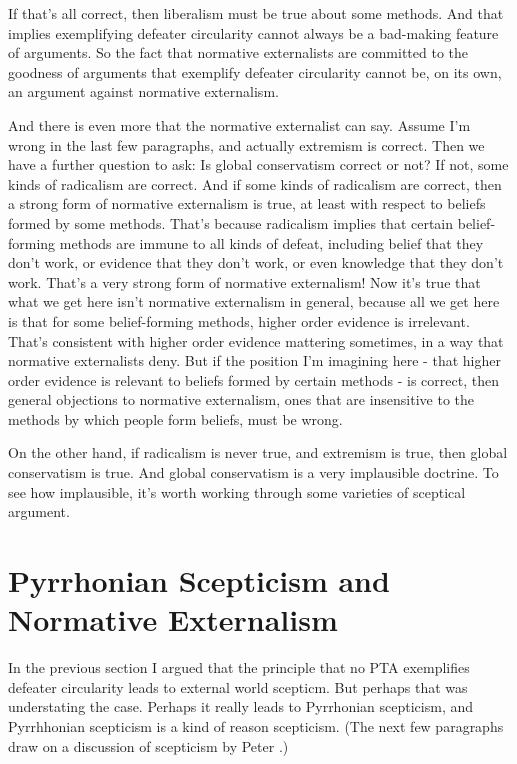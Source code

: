 If that's all correct, then liberalism must be true about some methods. And that implies exemplifying defeater circularity cannot always be a bad-making feature of arguments. So the fact that normative externalists are committed to the goodness of arguments that exemplify defeater circularity cannot be, on its own, an argument against normative externalism.

And there is even more that the normative externalist can say. Assume I'm wrong in the last few paragraphs, and actually extremism is correct. Then we have a further question to ask: Is global conservatism correct or not? If not, some kinds of radicalism are correct. And if some kinds of radicalism are correct, then a strong form of normative externalism is true, at least with respect to beliefs formed by some methods. That's because radicalism implies that certain belief-forming methods are immune to all kinds of defeat, including belief that they don't work, or evidence that they don't work, or even knowledge that they don't work. That's a very strong form of normative externalism! Now it's true that what we get here isn't normative externalism in general, because all we get here is that for some belief-forming methods, higher order evidence is irrelevant. That's consistent with higher order evidence mattering sometimes, in a way that normative externalists deny. But if the position I'm imagining here - that higher order evidence is relevant to beliefs formed by certain methods - is correct, then general objections to normative externalism, ones that are insensitive to the methods by which people form beliefs, must be wrong.

On the other hand, if radicalism is never true, and extremism is true, then global conservatism is true. And global conservatism is a very implausible doctrine. To see how implausible, it's worth working through some varieties of sceptical argument.

\section{Pyrrhonian Scepticism and Normative Externalism}
\label{pyrrhonianscepticismandnormativeexternalism}

In the previous section I argued that the principle that no PTA exemplifies defeater circularity leads to external world scepticm. But perhaps that was understating the case. Perhaps it really leads to Pyrrhonian scepticism, and Pyrrhhonian scepticism is a kind of reason scepticism. (The next few paragraphs draw on a discussion of scepticism by Peter \citet{KleinSEP}.)

